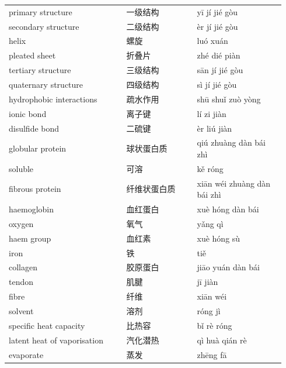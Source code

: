\documentclass[11pt]{article}
\begin{document}
\begin{longtable}{@{}p{0.40\linewidth}p{0.24\linewidth}p{0.30\linewidth}@{}}
primary structure & 一级结构 & yī jí jié gòu \\
secondary structure & 二级结构 & èr jí jié gòu \\
helix & 螺旋 & luó xuán \\
pleated sheet & 折叠片 & zhé dié piàn \\
tertiary structure & 三级结构 & sān jí jié gòu \\
quaternary structure & 四级结构 & sì jí jié gòu \\
hydrophobic interactions & 疏水作用 & shū shuǐ zuò yòng \\
ionic bond & 离子键 & lí zi jiàn \\
disulfide bond & 二硫键 & èr liú jiàn \\
globular protein & 球状蛋白质 & qiú zhuàng dàn bái zhì \\
soluble & 可溶 & kě róng \\
fibrous protein & 纤维状蛋白质 & xiān wéi zhuàng dàn bái zhì \\
haemoglobin & 血红蛋白 & xuè hóng dàn bái \\
oxygen & 氧气 & yǎng qì \\
haem group & 血红素 & xuè hóng sù \\
iron & 铁 & tiě \\
collagen & 胶原蛋白 & jiāo yuán dàn bái \\
tendon & 肌腱 & jī jiàn \\
fibre & 纤维 & xiān wéi \\
solvent & 溶剂 & róng jì \\
specific heat capacity & 比热容 & bǐ rè róng \\
latent heat of vaporisation & 汽化潜热 & qì huà qián rè \\
evaporate & 蒸发 & zhēng fā \\
\end{longtable}
\end{document}
